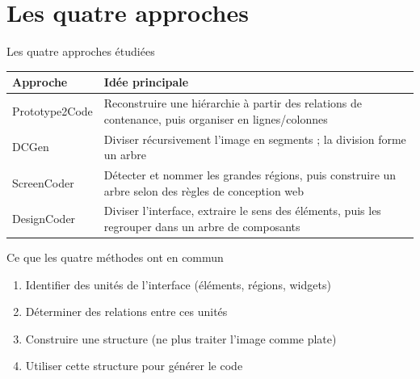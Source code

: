 \documentclass[11pt]{beamer}
\begin{document}
\section{Les quatre approches}

\begin{frame}{Les quatre approches étudiées}
\small
\begin{tabular}{p{3cm}p{8.5cm}}
\toprule
\textbf{Approche} & \textbf{Idée principale} \\
\midrule
Prototype2Code & Reconstruire une hiérarchie à partir des relations de contenance, puis organiser en lignes/colonnes \\
DCGen & Diviser récursivement l'image en segments ; la division forme un arbre \\
ScreenCoder & Détecter et nommer les grandes régions, puis construire un arbre selon des règles de conception web \\
DesignCoder & Diviser l'interface, extraire le sens des éléments, puis les regrouper dans un arbre de composants \\
\bottomrule
\end{tabular}
\end{frame}

\begin{frame}{Ce que les quatre méthodes ont en commun}
\begin{center}
\end{center}
\begin{enumerate}
\item Identifier des unités de l'interface (éléments, régions, widgets)
\item Déterminer des relations entre ces unités
\item Construire une structure (ne plus traiter l'image comme plate)
\item Utiliser cette structure pour générer le code
\end{enumerate}
\end{frame}
\end{document}

